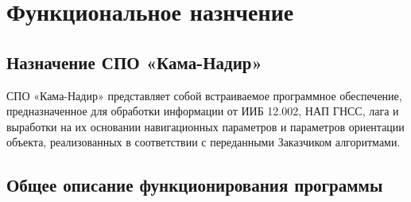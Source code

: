 \section{Функциональное назнчение} \label{purpose}
\subsection{Назначение СПО «Кама-Надир»}
СПО «Кама-Надир» представляет собой встраиваемое программное обеспечение, предназначенное для обработки информации от ИИБ 12.002, НАП ГНСС, 
лага и выработки на их основании навигационных параметров и параметров ориентации объекта, 
реализованных в соответствии с переданными Заказчиком алгоритмами.
\subsection{Общее описание функционирования программы}